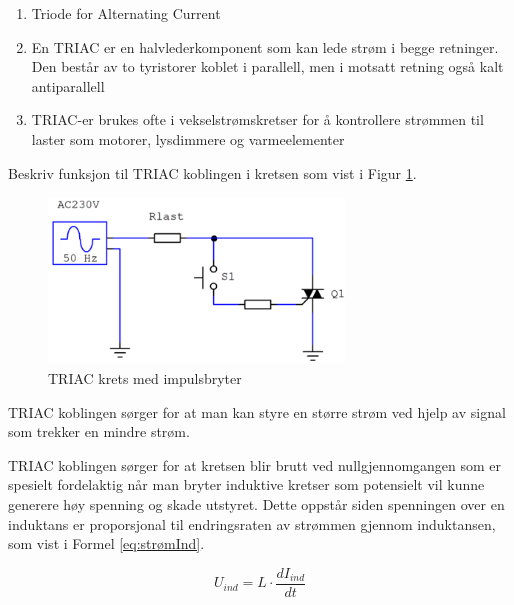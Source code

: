 \begin{solution}[name=Løsningsforslag]


	\begin{enumerate}[label=\roman*)]
	\item Triode for Alternating Current
	\item En TRIAC er en halvlederkomponent som kan lede strøm i begge retninger. Den består av to tyristorer koblet i parallell, men i motsatt retning også kalt antiparallell
	\item TRIAC-er brukes ofte i vekselstrømskretser for å kontrollere strømmen til laster som motorer, lysdimmere og varmeelementer

\end{enumerate}




\end{solution}




\begin{question}[name=Spørsmål, topic=tyristor]
Beskriv funksjon til TRIAC koblingen i kretsen som vist i Figur \ref{fig:triPush}.
\begin{figure}[H]
	\centering
	\includegraphics[width=0.7\textwidth]{tyristor/figurer/tricBasic.png}
	\caption{TRIAC krets med impulsbryter}
	\label{fig:triPush}
\end{figure}
\end{question}

\vspace{0.5cm} %

\begin{solution}[name=Løsningsforslag]
TRIAC koblingen sørger for at man kan styre en større strøm ved hjelp av signal som trekker en mindre strøm.

TRIAC koblingen sørger for at kretsen blir brutt ved nullgjennomgangen som er spesielt fordelaktig når man bryter induktive kretser som potensielt vil kunne generere høy spenning og skade utstyret. Dette oppstår siden spenningen over en induktans er proporsjonal til endringsraten av strømmen gjennom induktansen, som vist i Formel \ref{eq:strømInd}.

\begin{equation}
	\label{eq:strømInd}
	U_{ind}=L \cdot \frac{dI_{ind}}{dt}
\end{equation}

\end{solution}



